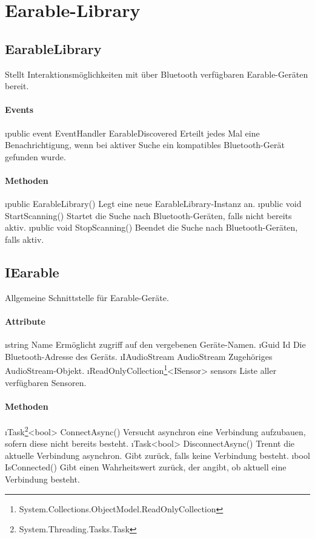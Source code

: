 \documentclass[../entwurf.tex]{subfiles}
\begin{document}
\section{Earable-Library}

\subsection{EarableLibrary}
Stellt Interaktionsmöglichkeiten mit über Bluetooth verfügbaren Earable-Geräten bereit.
\paragraph{Events}
\begin{itemize}
	\i{public event EventHandler EarableDiscovered} Erteilt jedes Mal eine Benachrichtigung, wenn bei aktiver Suche ein kompatibles Bluetooth-Gerät gefunden wurde.
\end{itemize}
\paragraph{Methoden}
\begin{itemize}
	\i{public EarableLibrary()} Legt eine neue EarableLibrary-Instanz an.
	\i{public void StartScanning()} Startet die Suche nach Bluetooth-Geräten, falls nicht bereits aktiv.
	\i{public void StopScanning()} Beendet die Suche nach Bluetooth-Geräten, falls aktiv.
\end{itemize}

\subsection{IEarable}
Allgemeine Schnittstelle für Earable-Geräte.
\paragraph{Attribute}
\begin{itemize}
	\i{string Name} Ermöglicht zugriff auf den vergebenen Geräte-Namen.
	\i{Guid Id} Die Bluetooth-Adresse des Geräts.
	\i{IAudioStream AudioStream} Zugehöriges AudioStream-Objekt.
	\i{ReadOnlyCollection\footnote{System.Collections.ObjectModel.ReadOnlyCollection}<ISensor> sensors} Liste aller verfügbaren Sensoren.
\end{itemize}
\paragraph{Methoden}
\begin{itemize}
	\i{Task\footnote{System.Threading.Tasks.Task}<bool> ConnectAsync()} Versucht asynchron eine Verbindung aufzubauen, sofern diese nicht bereits besteht.
	\i{Task<bool> DisconnectAsync()} Trennt die aktuelle Verbindung asynchron. Gibt  zurück, falls keine Verbindung besteht.
	\i{bool IsConnected()} Gibt einen Wahrheitswert zurück, der angibt, ob aktuell eine Verbindung besteht.
\end{itemize}
\end{document}
